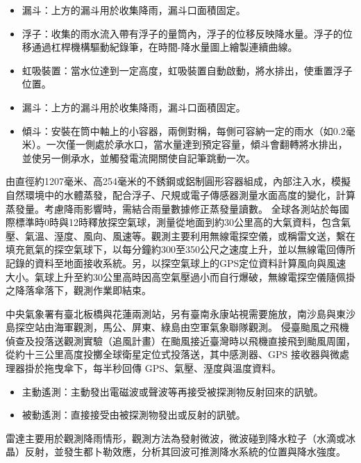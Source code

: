 \documentclass[a4paper,12pt]{report}
\begin{document}
\begin{itemize}
\begin{itemize}
\item 漏斗：上方的漏斗用於收集降雨，漏斗口面積固定。
\item 浮子：收集的雨水流入帶有浮子的量筒內，浮子的位移反映降水量。浮子的位移通過杠桿機構驅動紀錄筆，在時間-降水量圖上繪製連續曲線。
\item 虹吸裝置：當水位達到一定高度，虹吸裝置自動啟動，將水排出，使重置浮子位置。
\end{itemize}
\begin{itemize}
\item 漏斗：上方的漏斗用於收集降雨，漏斗口面積固定。
\item 傾斗：安裝在筒中軸上的小容器，兩側對稱，每側可容納一定的雨水（如0.2毫米）。一次僅一側處於承水口，當水量達到預定容量，傾斗會翻轉將水排出，並使另一側承水，並觸發電流開關使自記筆跳動一次。
\end{itemize}
由直徑約1207毫米、高254毫米的不銹鋼或鋁制圓形容器組成，內部注入水，模擬自然環境中的水體蒸發，配合浮子、尺規或電子傳感器測量水面高度的變化，計算蒸發量。考慮降雨影響時，需結合雨量數據修正蒸發量讀數。
全球各測站於每國際標準時0時與12時釋放探空氣球，測量從地面到約30公里高的大氣資料，包含氣壓、氣溫、溼度、風向、風速等。觀測主要利用無線電探空儀，或稱雷文送，繫在填充氦氣的探空氣球下，以每分鐘約300至350公尺之速度上升，並以無線電回傳所記錄的資料至地面接收系統。另，以探空氣球上的GPS定位資料計算風向與風速大小。氣球上升至約30公里高時因高空氣壓過小而自行爆破，無線電探空儀隨佩掛之降落傘落下，觀測作業即結束。

中央氣象署有臺北板橋與花蓮兩測站，另有臺南永康站視需要施放，南沙島與東沙島探空站由海軍觀測，馬公、屏東、綠島由空軍氣象聯隊觀測。
侵臺颱風之飛機偵查及投落送觀測實驗（追風計畫）在颱風接近臺灣時以飛機直接飛到颱風周圍，從約十三公里高度投擲全球衛星定位式投落送，其中感測器、GPS 接收器與微處理器掛於拖曳傘下，每半秒回傳 GPS、氣壓、溼度與溫度資料。
\begin{itemize}
\item 主動遙測：主動發出電磁波或聲波等再接受被探測物反射回來的訊號。
\item 被動遙測：直接接受由被探測物發出或反射的訊號。
\end{itemize}
雷達主要用於觀測降雨情形，觀測方法為發射微波，微波碰到降水粒子（水滴或冰晶）反射，並發生都卜勒效應，分析其回波可推測降水系統的位置與降水強度。


\end{itemize}
\end{document}
